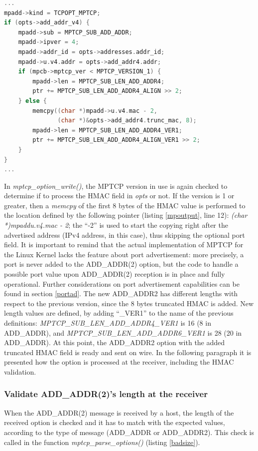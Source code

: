 \begin{lstlisting}[language=c, caption=Building the structure \textit{mp\_add\_addr (mpadd)} for ADD\_ADDR(2) outgoing message, label=mpoutput]
...
mpadd->kind = TCPOPT_MPTCP;
if (opts->add_addr_v4) {
	mpadd->sub = MPTCP_SUB_ADD_ADDR;
	mpadd->ipver = 4;
	mpadd->addr_id = opts->addresses.addr_id;
	mpadd->u.v4.addr = opts->add_addr4.addr;
	if (mpcb->mptcp_ver < MPTCP_VERSION_1) {
		mpadd->len = MPTCP_SUB_LEN_ADD_ADDR4;
		ptr += MPTCP_SUB_LEN_ADD_ADDR4_ALIGN >> 2;
	} else {
		memcpy((char *)mpadd->u.v4.mac - 2,
	           (char *)&opts->add_addr4.trunc_mac, 8);
		mpadd->len = MPTCP_SUB_LEN_ADD_ADDR4_VER1;
		ptr += MPTCP_SUB_LEN_ADD_ADDR4_ALIGN_VER1 >> 2;
	}
}
...
\end{lstlisting}

In \textit{mptcp\_option\_write()}, the MPTCP version in use is again checked to determine if to process the HMAC field in \textit{opts} or not. If the version is 1 or greater, then a \textit{memcpy} of the first 8 bytes of the HMAC value is performed to the location defined by the following pointer (listing \ref{mpoutput}, line 12): \textit{(char *)mpadd\textrightarrow u.v4.mac - 2}; the ``-2'' is used to start the copying right after the advertised address (IPv4 address, in this case), thus skipping the optional port field. It is important to remind that the actual implementation of MPTCP for the Linux Kernel lacks the feature about port advertisement: more precisely, a port is never added to the ADD\_ADDR(2) option, but the code to handle a possible port value upon ADD\_ADDR(2) reception is in place and fully operational. Further considerations on port advertisement capabilities can be found in section \ref{portad}. 
The new ADD\_ADDR2 has different lengths with respect to the previous version, since the 8 bytes truncated HMAC is added. New length values are defined, by adding ``\_VER1'' to the name of the previous definitions: \textit{MPTCP\_SUB\_LEN\_ADD\_ADDR4\_VER1} is 16 (8 in ADD\_ADDR), and \textit{MPTCP\_SUB\_LEN\_ADD\_ADDR6\_VER1} is 28 (20 in ADD\_ADDR). 
At this point, the ADD\_ADDR2 option with the added truncated HMAC field is ready and sent on wire. In the following paragraph it is presented how the option is processed at the receiver, including the HMAC validation.

\subsubsection{Validate ADD\_ADDR(2)'s length at the receiver}
When the ADD\_ADDR(2) message is received by a host, the length of the received option is checked and it has to match with the expected values, according to the type of message (ADD\_ADDR or ADD\_ADDR2). This check is called in the function \textit{mptcp\_parse\_options()} (listing \ref{badsize}).

